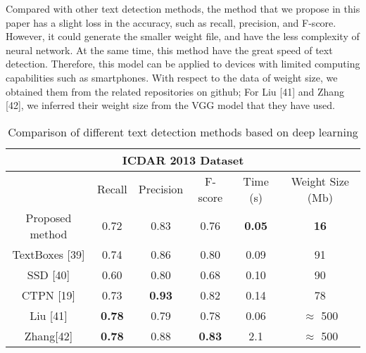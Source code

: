 \documentclass[22pt, UTF8]{article}
\numberwithin{figure}{section}
\numberwithin{table}{section}
\numberwithin{equation}{section} %
\begin{document}
\vspace{2mm} %

\setlength\parindent{2em} Compared with other text detection methods, the method that we propose in this paper has a slight loss in the accuracy, such as recall, precision, and F-score. However, it could generate the smaller weight file, and have the less complexity of neural network. At the same time, this method have the great speed of text detection. Therefore, this model can be applied to devices with limited computing capabilities such as smartphones. With respect to the data of weight size, we obtained them from the related repositories on github; For Liu [41] and Zhang [42], we inferred their weight size from the VGG model that they have used.

\begin{table}[!htbp]

\begin{center}
    \renewcommand\arraystretch{1.5}
    \begin{tabular}{|c|c|c|c|c|c|}
        \hline
        \multicolumn{6}{|c|}{ICDAR 2013 Dataset}                                                              \\ \hline
        & Recall        & Precision     & F-score       & Time (s)      & Weight Size (Mb) \\ \hline
        Proposed method    & 0.72          & 0.83          & 0.76          & \textbf{0.05} & \textbf{16}      \\ \hline
        TextBoxes {[}39{]} & 0.74          & 0.86          & 0.80          & 0.09          & 91               \\ \hline
        SSD {[}40{]}       & 0.60          & 0.80          & 0.68          & 0.10          & 90               \\ \hline
        CTPN {[}19{]}      & 0.73          & \textbf{0.93} & 0.82          & 0.14          & 78               \\ \hline
        Liu {[}41{]}       & \textbf{0.78} & 0.79          & 0.78          & 0.06          & $\approx$ 500    \\ \hline
        Zhang{[}42{]}      & \textbf{0.78} & 0.88          & \textbf{0.83} & 2.1           & $\approx$ 500    \\ \hline
    \end{tabular}
    \caption{Comparison of different text detection methods based on deep learning}
\end{center}
\end{table}
\end{document}
